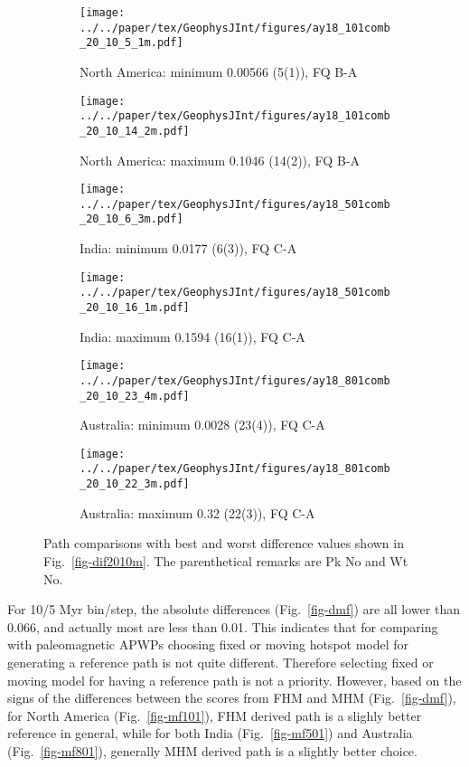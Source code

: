 \begin{figure*}
	\centering
	\begin{subfigure}{.43\textwidth}
		\texttt{[image: ../../paper/tex/GeophysJInt/figures/ay18\_101comb\_20\_10\_5\_1m.pdf]}
		\caption{North America: minimum 0.00566 (5(1)), FQ B-A}
	\end{subfigure}
	\begin{subfigure}{.43\textwidth}
		\texttt{[image: ../../paper/tex/GeophysJInt/figures/ay18\_101comb\_20\_10\_14\_2m.pdf]}
		\caption{North America: maximum 0.1046 (14(2)), FQ B-A}
	\end{subfigure}
	\vspace{.1em}
	\begin{subfigure}{.43\textwidth}
		\texttt{[image: ../../paper/tex/GeophysJInt/figures/ay18\_501comb\_20\_10\_6\_3m.pdf]}
		\caption{India: minimum 0.0177 (6(3)), FQ C-A}
	\end{subfigure}
	\begin{subfigure}{.43\textwidth}
		\texttt{[image: ../../paper/tex/GeophysJInt/figures/ay18\_501comb\_20\_10\_16\_1m.pdf]}
		\caption{India: maximum 0.1594 (16(1)), FQ C-A}
	\end{subfigure}
	\vspace{.1em}
	\begin{subfigure}{.43\textwidth}
		\texttt{[image: ../../paper/tex/GeophysJInt/figures/ay18\_801comb\_20\_10\_23\_4m.pdf]}
		\caption{Australia: minimum 0.0028 (23(4)), FQ C-A}
	\end{subfigure}
	\begin{subfigure}{.43\textwidth}
		\texttt{[image: ../../paper/tex/GeophysJInt/figures/ay18\_801comb\_20\_10\_22\_3m.pdf]}
		\caption{Australia: maximum 0.32 (22(3)), FQ C-A}
	\end{subfigure}
	\caption[Best and worst differences (20 Myr bin, 10 Myr
step)]{Path comparisons with best and worst difference values shown in
Fig.~\ref{fig-dif2010m}. The parenthetical remarks are Pk No and Wt No.}\label{fig-dif2010bwm}
\end{figure*}

For 10/5 Myr bin/step, the absolute differences (Fig.~\ref{fig-dmf}) are all
lower than 0.066, and actually most are less than 0.01. This indicates that for
comparing with paleomagnetic APWPs choosing fixed or moving hotspot model for
generating a reference path is not quite different. Therefore selecting fixed or
moving model for having a reference path is not a priority. However, based on
the signs of the differences between the scores from FHM and MHM
(Fig.~\ref{fig-dmf}), for North America (Fig.~\ref{fig-mf101}), FHM derived path
is a slighly better reference in general, while for both India
(Fig.~\ref{fig-mf501}) and Australia (Fig.~\ref{fig-mf801}), generally MHM
derived path is a slightly better choice.

